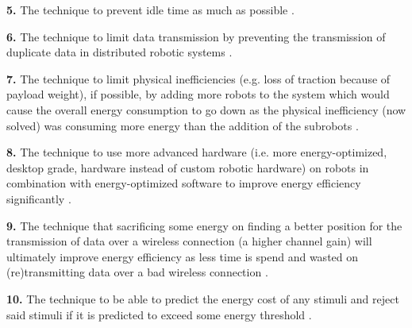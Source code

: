 \vspace{2mm}

\textbf{5.} The technique to prevent idle time as much as possible \cite{gurel2019industrial_robot_scheduling, 
kaitwanidvilai2020industrial_robot_cycle_time, wingstrom2013robot_cell_scheduling}.
    
\vspace{2mm}

\textbf{6.} The technique to limit data transmission by preventing the transmission of duplicate data in distributed robotic systems \cite{huh2013distributed_swarm}.

\vspace{2mm}

\textbf{7.} The technique to limit physical inefficiencies (e.g. loss of traction because of payload weight), if possible, by adding more robots to the system which would cause the overall
energy consumption to go down as the physical inefficiency (now solved) was consuming more energy than the addition of the subrobots \cite{kim2016firefighting_robot}.
    
\vspace{2mm}

\textbf{8.} The technique to use more advanced hardware (i.e. more energy-optimized, desktop grade, hardware instead of custom robotic hardware) 
on robots in combination with energy-optimized software to improve energy efficiency significantly \cite{cheng2018FPGA_image_recognition}.
    
\vspace{2mm}

\textbf{9.} The technique that sacrificing some energy on finding a better position for the transmission of data over a wireless connection
(a higher channel gain) will ultimately improve energy efficiency as less time is spend and wasted on (re)transmitting 
data over a bad wireless connection \cite{licea2013wireless_comms}.

\vspace{2mm}

\textbf{10.} The technique to be able to predict the energy cost of any stimuli and reject said stimuli if it is predicted to exceed some energy threshold 
\cite{kirtay2013humanoid_emotion}.

\vspace{5mm}

